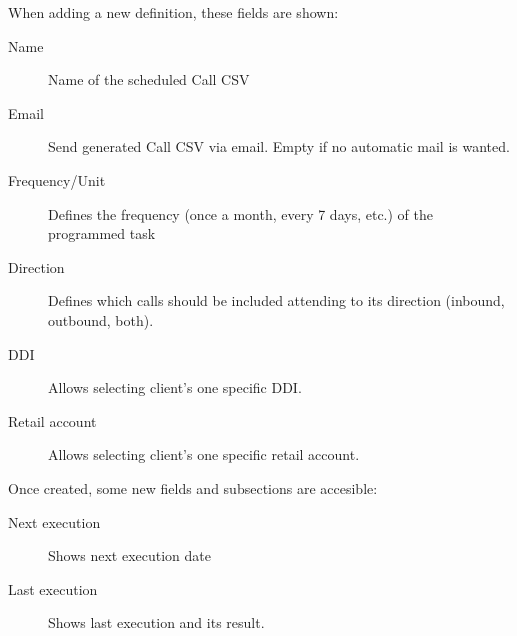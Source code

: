 \documentclass[letterpaper,10pt,english]{sphinxmanual}
\begin{document}
When adding a new definition, these fields are shown:
\begin{description}
\item[{Name}] \leavevmode{}\label{administration_portal/client/retail/calls/call_csv_schedulers:term-name}
Name of the scheduled Call CSV

\item[{Email}] \leavevmode{}\label{administration_portal/client/retail/calls/call_csv_schedulers:term-email}
Send generated Call CSV via email. Empty if no automatic mail is wanted.

\item[{Frequency/Unit}] \leavevmode{}\label{administration_portal/client/retail/calls/call_csv_schedulers:term-frequency-unit}
Defines the frequency (once a month, every 7 days, etc.) of the programmed task

\item[{Direction}] \leavevmode{}\label{administration_portal/client/retail/calls/call_csv_schedulers:term-direction}
Defines which calls should be included attending to its direction (inbound, outbound, both).

\item[{DDI}] \leavevmode{}\label{administration_portal/client/retail/calls/call_csv_schedulers:term-ddi}
Allows selecting client's one specific DDI.

\item[{Retail account}] \leavevmode{}\label{administration_portal/client/retail/calls/call_csv_schedulers:term-retail-account}
Allows selecting client's one specific retail account.

\end{description}

Once created, some new fields and subsections are accesible:
\begin{description}
\item[{Next execution}] \leavevmode{}\label{administration_portal/client/retail/calls/call_csv_schedulers:term-next-execution}
Shows next execution date

\item[{Last execution}] \leavevmode{}\label{administration_portal/client/retail/calls/call_csv_schedulers:term-last-execution}
Shows last execution and its result.

\end{description}
\end{document}
